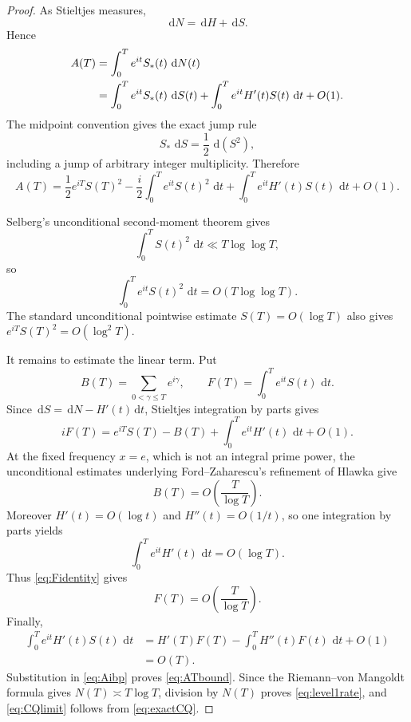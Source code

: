 \documentclass[11pt]{article}
\theoremstyle{definition}
\theoremstyle{remark}
\newcommand{\dd}{\,\mathrm d}
\begin{document}
\begin{proof}
As Stieltjes measures,
\[
\dd N=\dd H+\dd S.
\]
Hence
\begin{align}
A(T)
&=\int_0^T e^{it}S_*(t)\,\dd N(t)\notag\\
&=\int_0^T e^{it}S_*(t)\,\dd S(t)
 +\int_0^T e^{it}H'(t)S(t)\,\dd t+O(1).
\label{eq:Adecomp}
\end{align}
The midpoint convention gives the exact jump rule
\[
S_*\,\dd S=\frac12\,\dd(S^2),
\]
including a jump of arbitrary integer multiplicity.  Therefore
\begin{equation}\label{eq:Aibp}
A(T)=
\frac12e^{iT}S(T)^2
-\frac{i}{2}\int_0^T e^{it}S(t)^2\,\dd t
+\int_0^T e^{it}H'(t)S(t)\,\dd t
+O(1).
\end{equation}

Selberg's unconditional second-moment theorem gives
\begin{equation}\label{eq:Selberg2}
\int_0^T S(t)^2\,\dd t\ll T\log\log T,
\end{equation}
so
\[
\int_0^T e^{it}S(t)^2\,\dd t=O(T\log\log T).
\]
The standard unconditional pointwise estimate $S(T)=O(\log T)$ also gives $e^{iT}S(T)^2=O(\log^2T)$.

It remains to estimate the linear term.  Put
\[
B(T)=\sum_{0<\gamma\le T}e^{i\gamma},\qquad
F(T)=\int_0^T e^{it}S(t)\,\dd t.
\]
Since $\dd S=\dd N-H'(t)\dd t$, Stieltjes integration by parts gives
\begin{equation}\label{eq:Fidentity}
iF(T)
=e^{iT}S(T)-B(T)+\int_0^T e^{it}H'(t)\,\dd t+O(1).
\end{equation}
At the fixed frequency $x=e$, which is not an integral prime power, the unconditional estimates underlying Ford--Zaharescu's refinement of Hlawka give
\begin{equation}\label{eq:BT}
B(T)=O\!\left(\frac{T}{\log T}\right).
\end{equation}
Moreover $H'(t)=O(\log t)$ and $H''(t)=O(1/t)$, so one integration by parts yields
\[
\int_0^T e^{it}H'(t)\,\dd t=O(\log T).
\]
Thus \eqref{eq:Fidentity} gives
\begin{equation}\label{eq:Fbound}
F(T)=O\!\left(\frac{T}{\log T}\right).
\end{equation}
Finally,
\begin{align}
\int_0^T e^{it}H'(t)S(t)\,\dd t
&=H'(T)F(T)-\int_0^T H''(t)F(t)\,\dd t+O(1)\\
&=O(T).
\end{align}
Substitution in \eqref{eq:Aibp} proves \eqref{eq:ATbound}.  Since the Riemann--von Mangoldt formula gives $N(T)\asymp T\log T$, division by $N(T)$ proves \eqref{eq:level1rate}, and \eqref{eq:CQlimit} follows from \eqref{eq:exactCQ}.
\end{proof}
\end{document}
